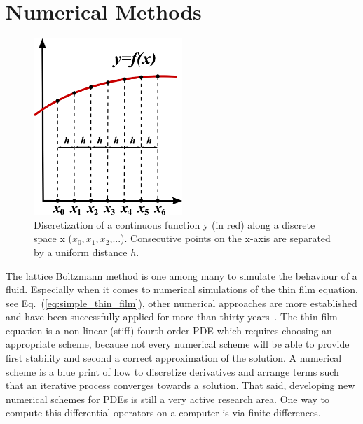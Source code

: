 \section{Numerical Methods}
\label{sec:numerical_methods}
\begin{figure}
    \centering
    \includegraphics[width=0.5\textwidth]{graphics/800px-Finite_Differences.svg.png}
    \caption{Discretization of a continuous function y (in red) along a discrete space x ($x_0, x_1, x_2$,...).
    Consecutive points on the x-axis are separated by a uniform distance $h$.
    }
    \label{fig:finite_difference}
\end{figure}
The lattice Boltzmann method is one among many to simulate the behaviour of a fluid.
Especially when it comes to numerical simulations of the thin film equation, see Eq.~(\ref{eq:simple_thin_film}), other numerical approaches are more established and have been successfully applied for more than thirty years~\cite{beckerComplexDewettingScenarios2003, peschkaSignaturesSlipDewetting2019, davidovitchSpreadingViscousFluid2005, meckeThermalFluctuationsThin2005, diezGlobalModelsMoving2000, schwartzSimulationDropletMotion1998}.
The thin film equation is a non-linear (stiff) fourth order PDE which requires choosing an appropriate scheme, because not every numerical scheme will be able to provide first stability and second a correct approximation of the solution.
A numerical scheme is a blue print of how to discretize derivatives and arrange terms such that an iterative process converges towards a solution.
That said, developing new numerical schemes for PDEs is still a very active research area.
One way to compute this differential operators on a computer is via finite differences.


